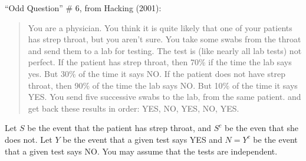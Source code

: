 \documentclass[addpoints,12pt]{exam}
\begin{document}
\begin{questions}
\question ``Odd Question'' \# 6, from Hacking (2001):
	\begin{quote}You are a physician. You think it is quite likely that one of your patients has strep throat, but you aren't sure. You take some swabs from the throat and send them to a lab for testing. The test is (like nearly all lab tests) not perfect. If the patient has strep throat, then 70\% if the time the lab says yes. But 30\% of the time it says NO. If the patient does not have strep throat, then 90\% of the time the lab says NO. But 10\% of the time it says YES. You send five successive swabs to the lab, from the same patient. and get back these results in order: YES, NO, YES, NO, YES.\end{quote} 
	Let $S$ be the event that the patient has strep throat, and $S^c$ be the even that she does not. Let $Y$ be the event that a given test says YES and $N = Y^c$ be the event that a given test says NO. You may assume that the tests are independent.

	\begin{parts}

\end{parts}
\end{questions}
\end{document}
